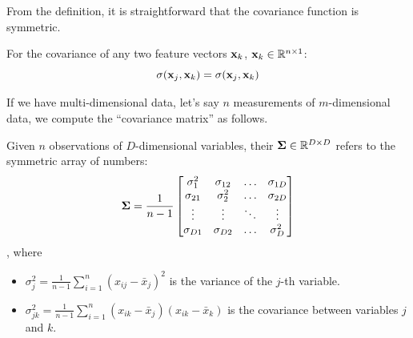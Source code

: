 \documentclass[a4paper]{article}
\begin{document}
From the definition, it is straightforward that the covariance function is symmetric.
\begin{corollary}
For the covariance of any two feature vectors $\textbf{x}_k$, $\textbf{x}_k\in \mathbb{R}^{n\times 1}$:
\begin{equation}
    \sigma(\textbf{x}_j,\textbf{x}_k) = \sigma(\textbf{x}_j,\textbf{x}_k)  
\end{equation}
\end{corollary}
If we have multi-dimensional data, let's say $n$ measurements of $m$-dimensional data, we compute the ``covariance matrix'' as follows.
\begin{definition}
Given $n$ observations of $D$-dimensional variables, their  $\boldsymbol{\Sigma}\in \mathbb{R}^{D\times D}$ refers to the symmetric array of numbers:
\begin{equation}
    \boldsymbol{\Sigma} = 
    \frac{1}{n-1}
    \begin{bmatrix}
    \sigma_1^2 & \sigma_{12} & \ldots & \sigma_{1D}\\
    \sigma_{21} & \sigma_2^2 & \ldots & \sigma_{2D}\\
    \vdots & \vdots & \ddots & \vdots \\
    \sigma_{D1} & \sigma_{D2} & \ldots & \sigma_D^2 
    \end{bmatrix}
    \label{eq:cov_alg_form}
\end{equation}
, where
\begin{itemize}
    \item $\sigma_j^2 = \frac{1}{n-1}\sum\limits_{i=1}^{n}(x_{ij} - \bar{x}_j)^2$ is the variance of the $j$-th variable.
    \item $\sigma_{jk}^2 = \frac{1}{n-1}\sum\limits_{i=1}^{n}( x_{ik} - \bar{x}_j)(x_{ik} - \bar{x}_k)$ is the covariance between variables $j$ and $k$.
\end{itemize}
\end{definition}
\end{document}
